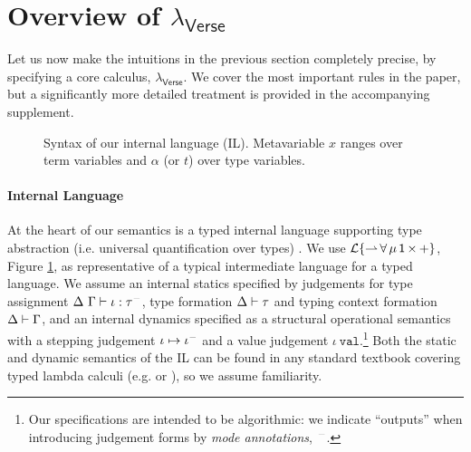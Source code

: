\documentclass[preprint]{sigplanconf}
\newcommand{\moutput}{^{\color{gray}-}}
\begin{document}
\section{Overview of $\lambda_\textsf{Verse}$}\label{atlam}\label{overview}
Let us now make the intuitions in the previous section completely precise, by specifying a core calculus, $\lambda_\textsf{Verse}$. We cover the most important rules in the paper, but a significantly more detailed treatment is provided in the accompanying supplement.
\begin{figure}[t]
\small
\hspace{-5px}
\caption{Syntax of our internal language (IL). Metavariable $x$ ranges over term variables and $\alpha$ (or $t$) over type variables.}
\label{syntax-IL}
\vspace{-10px}
\end{figure}
\paragraph{Internal Language} 
At the heart of our semantics is a typed internal language supporting type abstraction (i.e. universal quantification over types) \cite{Reynolds94anintroduction}. We use {$\mathcal{L}\{{\rightharpoonup}\,{\forall}\,{\mu}\,{{\sf 1}}\,{\times}\,{+}\}$}, Figure \ref{syntax-IL}, as representative of a typical intermediate language for a typed language. %
We assume an internal statics specified by judgements for type assignment {$\iDelta~\iGamma \vdash \iota : \tau\moutput$}, type formation {$\Delta \vdash \tau$} and typing context formation { $\Delta \vdash \Gamma$}, and an 
internal dynamics specified as a structural operational semantics with a stepping judgement {\small $\iota \mapsto \iota\moutput$} and a value judgement {$\iota~\mathtt{val}$}.\footnote{Our specifications are intended to be algorithmic: we indicate ``outputs'' when introducing judgement forms by \emph{mode annotations}, $\moutput$.} Both the static and dynamic semantics of the IL can be found in any standard textbook covering typed lambda calculi (e.g. \cite{pfpl} or \cite{tapl}), so we assume familiarity.
\end{document}
